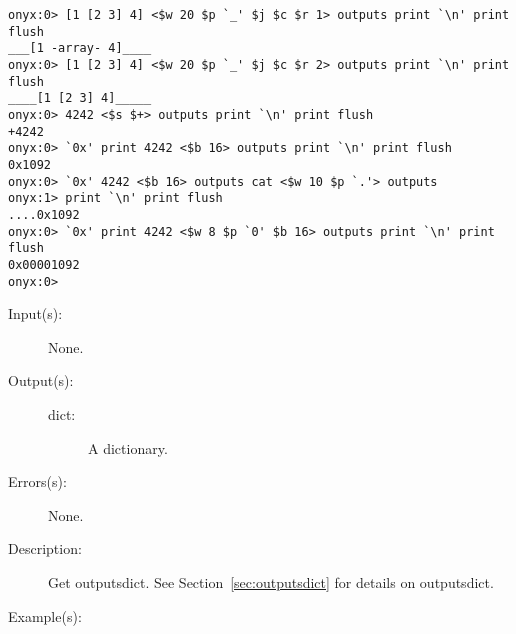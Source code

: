 \begin{description}
\begin{description}
\begin{verbatim}
onyx:0> [1 [2 3] 4] <$w 20 $p `_' $j $c $r 1> outputs print `\n' print flush
___[1 -array- 4]____
onyx:0> [1 [2 3] 4] <$w 20 $p `_' $j $c $r 2> outputs print `\n' print flush
____[1 [2 3] 4]_____
onyx:0> 4242 <$s $+> outputs print `\n' print flush
+4242
onyx:0> `0x' print 4242 <$b 16> outputs print `\n' print flush
0x1092
onyx:0> `0x' 4242 <$b 16> outputs cat <$w 10 $p `.'> outputs
onyx:1> print `\n' print flush
....0x1092
onyx:0> `0x' print 4242 <$w 8 $p `0' $b 16> outputs print `\n' print flush
0x00001092
onyx:0>
		\end{verbatim}
	\end{description}
\label{systemdict:outputsdict}
\item[{\onyxop{--}{outputsdict}{dict}}: ]
	\begin{description}\item[]
	\item[Input(s): ] None.
	\item[Output(s): ]
		\begin{description}\item[]
		\item[dict: ]
			A dictionary.
		\end{description}
	\item[Errors(s): ] None.
	\item[Description: ]
		Get outputsdict.  See Section~\ref{sec:outputsdict} for details
		on outputsdict.
	\item[Example(s): ]\begin{verbatim}


\end{verbatim}
\end{description}
\end{description}
